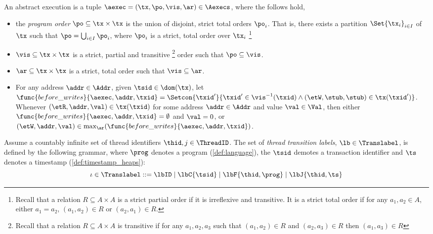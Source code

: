 \begin{defn}
An abstract execution is a tuple $\aexec = (\tx, \po, \vis, \ar) \in \Aexecs$, where the follows hold,

\begin{itemize}
\item
the \emph{program order} $\po \subseteq \tx \times \tx$ is the union of disjoint, strict total orders \( \po_{i} \).
That is, there exists a partition $\Set{ \tx_{i} }_{i \in I}$ of $\tx$ such that $\po = \bigcup_{i \in I} \po_{i}$, where $\po_{i}$ is a strict, total order over $\tx_i$%
\footnote{Recall that a relation $R \subseteq A \times A$ is a strict partial order if it is irreflexive and transitive.
It is a strict total order if for any $a_1, a_2 \in A$, either $a_1 = a_2$, $(a_1, a_2) \in R$ or $(a_2, a_1) \in R$.}

\item 
$\vis \subseteq \tx \times \tx$ is a strict, partial and transitive%
\footnote{Recall that a relation $R \subseteq A \times A$ is transitive if for any \( a_{1}, a_{2}, a_{3}\) such that \( (a_{1}, a_{2} ) \in R\) and \( (a_{2}, a_{3} ) \in R \) then \( (a_{1}, a_{3} ) \in R \)}
order such that $\po \subseteq \vis$. 

\item 
$\ar \subseteq \tx \times \tx$ is a strict, total order such that $\vis \subseteq \ar$.

\item 
For any address $\addr \in \Addr$, given $\tsid \in \dom(\tx)$, let $\func{before\_writes}{\aexec, \addr, \txid} = \Setcon{\txid' }{ \txid' \in \vis^{-1}(\txid) \land (\etW, \stub, \stub) \in \tx(\txid')}$. 
Whenever $( \etR, \addr, \val) \in \tx(\txid)$ for some address $\addr \in \Addr$ and value $\val \in \Val$, then either $\func{before\_writes}{\aexec, \addr, \txid} = \emptyset$ and $\val = 0$, or \( ( \etW, \addr, \val) \in \max_{\ar}(\func{before\_writes}{\aexec, \addr, \txid}) \).
\end{itemize}
\end{defn}


\begin{defn}
\label{def:label}
Assume a countably infinite set of thread identifiers $\thid,j \in \ThreadID$.
The set of \emph{thread transition labels}, $\lb \in \Translabel$, is defined by the following grammar, where $\prog$ denotes a program (\ref{def:language}), the $\tsid$ demotes a transaction identifier and $\ts$ denotes a timestamp (\ref{def:timestamp_heaps}):
\[
	\iota \in \Translabel ::= \lbID \mid \lbC{\tsid} \mid \lbF{\thid,\prog} \mid \lbJ{\thid,\ts}
\]
\end{defn}








